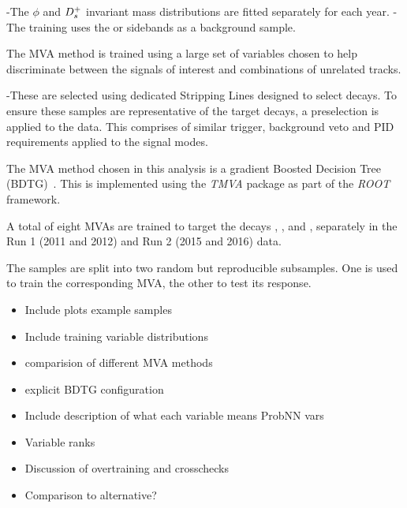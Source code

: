 {\color{Blue}
-The $\phi$ and ${{D}^+_{s}}$ invariant mass distributions are fitted separately for each year. 
- The training uses the \phiz or \Dsp sidebands as a background sample.
}

The MVA method is trained using a large set of variables chosen to help discriminate between the signals of interest and combinations of unrelated tracks.

{\color{Blue}

-These are selected using dedicated Stripping Lines designed to select decays. To ensure these samples are representative of the target decays, a preselection is applied to the data. This comprises of similar trigger, background veto and PID requirements applied to the signal modes.
}

The MVA method chosen in this analysis is a gradient Boosted Decision Tree (BDTG)~\cite{Breiman}. This is implemented using the \emph{TMVA} package as part of the \emph{ROOT} framework. 


A total of eight MVAs are trained to target the decays \decay{\phi}{\Kp\Km}, \decay{\Dsp}{\Kp\Km\pip}, \decay{\Dsp}{\Kp\pim\pip} and \decay{\Dsp}{\pip\pim\pip}, separately in the Run 1 (2011 and 2012) and Run 2 (2015 and 2016) data.

The samples are split into two random but reproducible subsamples. One is used to train the corresponding MVA, the other to test its response. 



{\color{Red}
\begin{itemize}
\item Include plots example samples
\item Include training variable distributions
\item comparision of different MVA methods
\item explicit BDTG configuration
\item Include description of what each variable means \eg ProbNN vars
\item Variable ranks
\item Discussion of overtraining and crosschecks
\item Comparison to alternative? 
\end{itemize}
}
 


